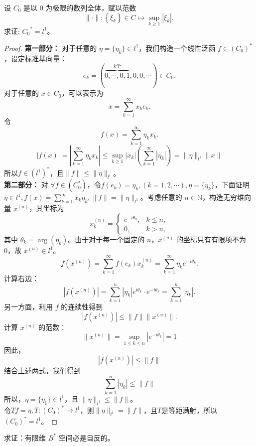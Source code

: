 \documentclass[lang=cn,newtx,10pt,scheme=chinese,thmcnt=chapter]{elegantbook}
\begin{document}
\begin{problem}
  设 ${C_0}$ 是以 0 为极限的数列全体，赋以范数
\[
  \|\cdot\| : \left\{\xi_k\right\} \in {C} \mapsto \sup_{k \geqslant 1} |\xi_k|,
  \]
  求证: ${C_0}^* ={l}^1$。
\end{problem}
\begin{proof}
\textbf{第一部分：} 对于任意的 $\eta = \{\eta_k\} \in l^1$，我们构造一个线性泛函 $f \in (C_0)^*$，设定标准基向量：
\[
e_k = (\overbrace{0, \cdots, 0,1}^{k \text{个}}, 0, 0, \cdots) \in C_0.
\]
对于任意的 $x \in C_0$，可以表示为
\[
x = \sum_{k=1}^{\infty} x_k e_k.
\]
令  
\[
f(x) = \sum_{k=1}^{\infty} \eta_k x_k.
\]
\[|f(x)|=|\sum_{k=1}^{\infty} \eta_k x_k|\leqslant \sup_{k \geqslant 1} |x_k|\left(\sum_{k=1}^{\infty}|\eta_k|\right)=\|\eta\|_{l^1}\|x\|\]
所以$f\in(l^1)^*$，且$\|f\|\leqslant\|\eta\|_{l^1}$。\\
\textbf{第二部分：} 对 $\forall f \in (C_0^*)$，令$f(e_k)=\eta_k,(k=1,2,\cdots),\eta=\{\eta_k\}$，下面证明$\eta \in l^1,f(x)=\sum\limits_{k=1}^\infty x_k\eta_k,\|f\|=\|\eta\|_{l^1}$。考虑任意的 $n \in \mathbb{N}$，构造无穷维向量 $x^{(n)}$，其坐标为
\[
x_k^{(n)} = \begin{cases} 
 e^{-i \theta_k}, & k \leqslant n, \\
0, & k > n,
\end{cases}
\]
其中 $\theta_k = \arg(\eta_k)$。由于对于每一个固定的 $n$，$x^{(n)}$ 的坐标只有有限项不为 0，故 $x^{(n)} \in l^1$。
\[
 f( x^{(n)}) = \sum_{k=1}^{\infty} f(e_k) x_k^{(n)} = \sum_{k=1}^{\infty} \eta_k  e^{-i \theta_k}.
\]
计算右边：
\[
| f( x^{(n)}) | = \sum_{k=1}^n  |\eta_k| e^{i \theta_k} \cdot e^{-i \theta_k} = \sum_{k=1}^n |\eta_k|.
\]
另一方面，利用 $f$ 的连续性得到
\[
| f(x^{(n)}) |\leqslant \|f\| \|x^{(n)}\|.
\]
计算 $x^{(n)}$ 的范数：
\[
\|x^{(n)}\| = \sup_{1\leqslant k\leqslant n} |e^{-i\theta_k}|=1
\]
因此，
\[
| f(x^{(n)}) | \leqslant \|f\| 
\]
结合上述两式，我们得到
\[
\sum_{k=1}^n |\eta_k| \leqslant \|f\| 
\]
所以，$\eta = \{\eta_1\} \in l^1$，且 $\|\eta\|_{l^1} \leqslant \|f\|$。\\
令$Tf=\eta,T:(C_0)^*\rightarrow l^1$，则$\|\eta\|_{l^1}=\|f\|$，且$T$是等距满射，所以 $(C_0)^*=l^1$。
\end{proof}
\begin{problem}
  求证：有限维 ${B}^*$ 空间必是自反的。
\end{problem}
\end{document}
